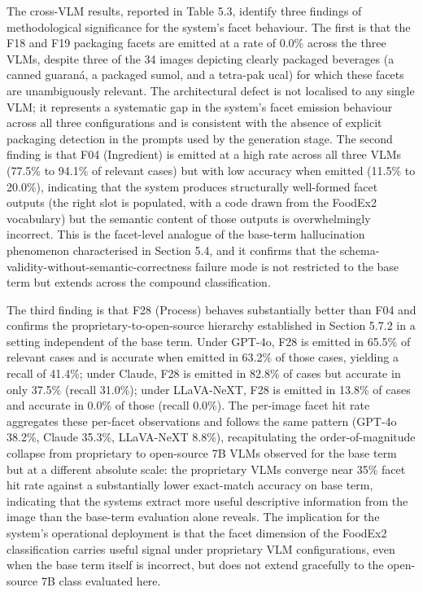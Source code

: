 The cross-VLM results, reported in Table 5.3, identify three findings of methodological significance for the system's facet behaviour. The first is that the F18 and F19 packaging facets are emitted at a rate of 0.0\% across the three VLMs, despite three of the 34 images depicting clearly packaged beverages (a canned guaraná, a packaged sumol, and a tetra-pak ucal) for which these facets are unambiguously relevant. The architectural defect is not localised to any single VLM; it represents a systematic gap in the system's facet emission behaviour across all three configurations and is consistent with the absence of explicit packaging detection in the prompts used by the generation stage. The second finding is that F04 (Ingredient) is emitted at a high rate across all three VLMs (77.5\% to 94.1\% of relevant cases) but with low accuracy when emitted (11.5\% to 20.0\%), indicating that the system produces structurally well-formed facet outputs (the right slot is populated, with a code drawn from the FoodEx2 vocabulary) but the semantic content of those outputs is overwhelmingly incorrect. This is the facet-level analogue of the base-term hallucination phenomenon characterised in Section 5.4, and it confirms that the schema-validity-without-semantic-correctness failure mode is not restricted to the base term but extends across the compound classification.

The third finding is that F28 (Process) behaves substantially better than F04 and confirms the proprietary-to-open-source hierarchy established in Section 5.7.2 in a setting independent of the base term. Under GPT-4o, F28 is emitted in 65.5\% of relevant cases and is accurate when emitted in 63.2\% of those cases, yielding a recall of 41.4\%; under Claude, F28 is emitted in 82.8\% of cases but accurate in only 37.5\% (recall 31.0\%); under LLaVA-NeXT, F28 is emitted in 13.8\% of cases and accurate in 0.0\% of those (recall 0.0\%). The per-image facet hit rate aggregates these per-facet observations and follows the same pattern (GPT-4o 38.2\%, Claude 35.3\%, LLaVA-NeXT 8.8\%), recapitulating the order-of-magnitude collapse from proprietary to open-source 7B VLMs observed for the base term but at a different absolute scale: the proprietary VLMs converge near 35\% facet hit rate against a substantially lower exact-match accuracy on base term, indicating that the systems extract more useful descriptive information from the image than the base-term evaluation alone reveals. The implication for the system's operational deployment is that the facet dimension of the FoodEx2 classification carries useful signal under proprietary VLM configurations, even when the base term itself is incorrect, but does not extend gracefully to the open-source 7B class evaluated here.

